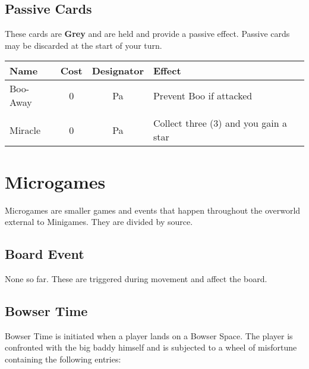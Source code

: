 \documentclass{article}
\begin{document}
\subsection{Passive Cards}

These cards are \textbf{Grey} and are held and provide a passive effect.
Passive cards may be discarded at the start of your turn.
\vspace*{2ex}

\begin{tabular}{lccl}
\textbf{Name} & \textbf{Cost} & \textbf{Designator} & \textbf{Effect} \\
\hline
Boo-Away & 0 & Pa & Prevent Boo if attacked \\
&&& \\
Miracle & 0 & Pa & Collect three (3) and you gain a star \\
\end{tabular}

\section{Microgames}

Microgames are smaller games and events that happen throughout the overworld external
to Minigames.  They are divided by source.

\subsection{Board Event}

None so far. These are triggered during movement and affect the board.

\subsection{Bowser Time}

Bowser Time is initiated when a player lands on a Bowser Space.  The player
is confronted with the big baddy himself and is subjected to a wheel of
misfortune containing the following entries:
\end{document}
